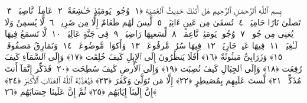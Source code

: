 
  
    
  
    
    

\nopagebreak
  بِسمِ ٱللَّهِ ٱلرَّحمَـٰنِ ٱلرَّحِيمِ
  هَل أَتَىٰكَ حَدِيثُ ٱلغَٰشِيَةِ ﴿١﴾
 وُجُوهٌۭ يَومَئِذٍ خَـٰشِعَةٌ ﴿٢﴾
 عَامِلَةٌۭ نَّاصِبَةٌۭ ﴿٣﴾
 تَصلَىٰ نَارًا حَامِيَةًۭ ﴿٤﴾
 تُسقَىٰ مِن عَينٍ ءَانِيَةٍۢ ﴿٥﴾
 لَّيسَ لَهُم طَعَامٌ إِلَّا مِن ضَرِيعٍۢ ﴿٦﴾
 لَّا يُسمِنُ وَلَا يُغنِى مِن جُوعٍۢ ﴿٧﴾
 وُجُوهٌۭ يَومَئِذٍۢ نَّاعِمَةٌۭ ﴿٨﴾
 لِّسَعيِهَا رَاضِيَةٌۭ ﴿٩﴾
 فِى جَنَّةٍ عَالِيَةٍۢ ﴿١٠﴾
 لَّا تَسمَعُ فِيهَا لَـٰغِيَةًۭ ﴿١١﴾
 فِيهَا عَينٌۭ جَارِيَةٌۭ ﴿١٢﴾
 فِيهَا سُرُرٌۭ مَّرفُوعَةٌۭ ﴿١٣﴾
 وَأَكوَابٌۭ مَّوضُوعَةٌۭ ﴿١٤﴾
 وَنَمَارِقُ مَصفُوفَةٌۭ ﴿١٥﴾
 وَزَرَابِىُّ مَبثُوثَةٌ ﴿١٦﴾
 أَفَلَا يَنظُرُونَ إِلَى ٱلإِبِلِ كَيفَ خُلِقَت ﴿١٧﴾
 وَإِلَى ٱلسَّمَآءِ كَيفَ رُفِعَت ﴿١٨﴾
 وَإِلَى ٱلجِبَالِ كَيفَ نُصِبَت ﴿١٩﴾
 وَإِلَى ٱلأَرضِ كَيفَ سُطِحَت ﴿٢٠﴾
 فَذَكِّر إِنَّمَآ أَنتَ مُذَكِّرٌۭ ﴿٢١﴾
 لَّستَ عَلَيهِم بِمُصَيطِرٍ ﴿٢٢﴾
 إِلَّا مَن تَوَلَّىٰ وَكَفَرَ ﴿٢٣﴾
 فَيُعَذِّبُهُ ٱللَّهُ ٱلعَذَابَ ٱلأَكبَرَ ﴿٢٤﴾
 إِنَّ إِلَينَآ إِيَابَهُم ﴿٢٥﴾
 ثُمَّ إِنَّ عَلَينَا حِسَابَهُم ﴿٢٦﴾
 
